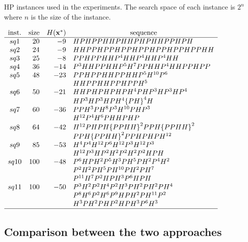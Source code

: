 \begin{table}[htbp]
	\begin{center}
		\caption{HP instances used in the experiments. The search space of each instance is $2^n$ where $n$ is the size of
			the instance.}
		\label{tab:instances}
		{$\begin{array}{c r r l}
			\text{inst.} & \text{size} &  \multicolumn{1}{ c }{H({\bf{x}}^*)} & \multicolumn{1}{c}{\text{sequence}} \\ \hline
			sq1 &20 &-9 & HPHPPHHPHHPHPHHPPHPH \\
			sq2 &24 &-9 & HHPPHPPHPPHPPHPPHPPHPPHH \\
			sq3 &25 &-8 & PPHPPHHP^4HHP^4HHP^4HH \\
			sq4 &36 &-14 &  P^3HHPPHHP^5H^7PPHHP^4HHPPHPP\\
			sq5 &48 &-23 &  PPHPPHHPPHHP^5H^{10}P^6 \\
			&   &    &  HHPPHHPPHPPH^5 \\
			sq6 &50 &-21 &  HHPHPHPHPH^4PHP^3HP^3HP^4 \\
			&   &    & HP^3HP^3HPH^4{\{PH\}}^4H\\
			sq7 &60 &-36 &  PPH^3PH^8P^3H^{10}PHP^3\\
			&   &    &  H^{12}P^4H^6PHHPHP\\
			sq8 &64 &-42 &   H^{12}PHPH{\{PPHH\}}^2PPH{\{PPHH\}}^2\\
			&   &    &  PPH{\{PPHH\}}^2PPHPHPH^{12}\\
			sq9  &85   &-53  & H^4P^4H^{12}P^6 H^{12} P^3 H^{12} P^3 \\
			&   &    &    H^{12} P^3  H P^2 H^2    P^2 H^2  P^2 H P H  \\
			sq10  &100  &-48  &  P^6HPH^{2}P^5H^{3}PH^5PH^{2} P^4 H^{2} \\
			&   &    &   P^2  H^2 P  H^5  P H^{10} P H^{2} P H^{7}  \\
			&   &    &  P^{11} H^{7} P^2  H P   H^3  P^{6} H P H \\
			sq11 &100  &-50  &  P^3H^{2}P^2H^{4}P^2H^{3}PH^{2} PH^{2}PH^{4} \\
			&   &    & P^8 H^6 P^{2} H^{6} P^{9} H P H^{2} P  H^{11} P^2  \\
			&   &    &H^3 P  H^{2} P H P^2  H P H^3 P^6 H^3\\ \hline
			\end{array}$}
	\end{center}
\end{table}

\subsection{Comparison between the two approaches}

